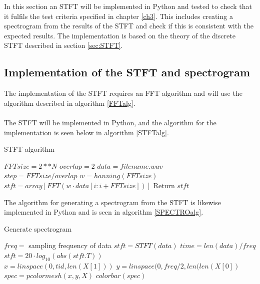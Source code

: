 In this section an STFT will be implemented in Python and tested to check that it fulfils the test criteria specified in chapter \ref{ch3}. This includes creating a spectrogram from the results of the STFT and check if this is consistent with the expected results. The implementation is based on the theory of the discrete STFT described in section \ref{sec:STFT}.

\subsection{Implementation of the STFT and spectrogram}
The implementation of the STFT requires an FFT algorithm and will use the algorithm described in algorithm \ref{FFTalg}.
\\ \\
The STFT will be implemented in Python, and the algorithm for the implementation is seen below in algorithm \ref{STFTalg}.
\begin{algorithm}[H]
\caption{STFT algorithm}
\label{STFTalg}
\begin{algorithmic}[1]
\State $FFTsize=2**N$ 
\State $overlap=2$ 
\State $data = filename.wav$ \\
\State $step=FFTsize/overlap$
\State $w=hanning(FFTsize)$ 
\State $stft = array[FFT(w\cdot data[i:i+FFTsize])]$
\EndFor
\State Return $stft$
\EndProcedure
\end{algorithmic}
\end{algorithm}

The algorithm for generating a spectrogram from the STFT is likewise implemented in Python and is seen in algorithm \ref{SPECTROalg}.
\begin{algorithm}[H]
\caption{Generate spectrogram}
\label{SPECTROalg}
\begin{algorithmic}[1]
\State $freq=$ sampling frequency of data
\State $stft=STFT(data)$ 
\State $time=len(data)/freq$ 
\State $stft=20\cdot log_{10}(abs(stft.T))$ \\
\State $x=linspace(0,tid,len(X[1]))$ 
\State $y=linspace(0,freq/2,len(len(X[0])$ \\
\State $spec=pcolormesh(x,y,X)$ 
\State $colorbar(spec)$ 
\end{algorithmic}
\end{algorithm}


